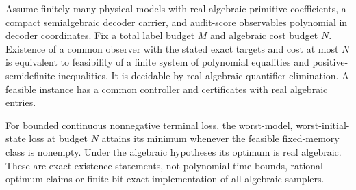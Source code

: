 \begin{corollary}\label{cor:memory-algebraic}
Assume finitely many physical models with real algebraic primitive coefficients, a compact semialgebraic decoder carrier, and audit-score observables polynomial in decoder coordinates. Fix a total label budget $M$ and algebraic cost budget $N$. Existence of a common observer with the stated exact targets and cost at most $N$ is equivalent to feasibility of a finite system of polynomial equalities and positive-semidefinite inequalities. It is decidable by real-algebraic quantifier elimination. A feasible instance has a common controller and certificates with real algebraic entries.

For bounded continuous nonnegative terminal loss, the worst-model, worst-initial-state loss at budget $N$ attains its minimum whenever the feasible fixed-memory class is nonempty. Under the algebraic hypotheses its optimum is real algebraic. These are exact existence statements, not polynomial-time bounds, rational-optimum claims or finite-bit exact implementation of all algebraic samplers.
\end{corollary}
